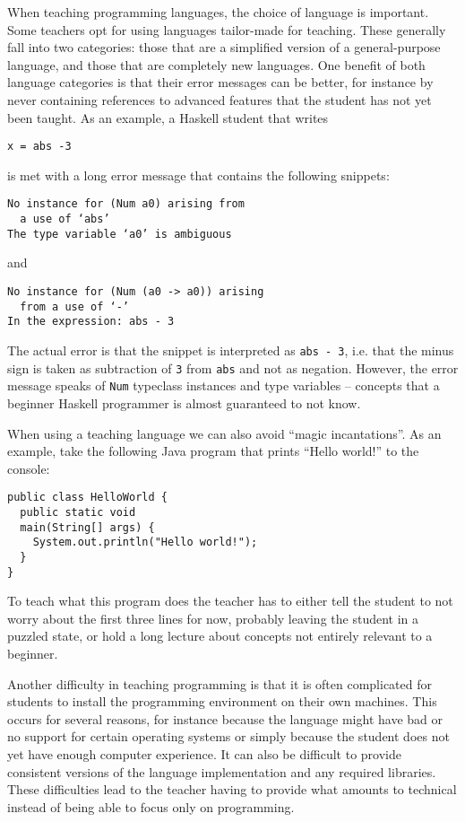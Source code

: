 When teaching programming languages, the choice of language is important.  Some
teachers opt for using languages tailor-made for teaching. These generally fall
into two categories: those that are a simplified version of a general-purpose
language, and those that are completely new languages. One benefit of both
language categories is that their error messages can be better, for instance by
never containing references to advanced features that the student has not yet
been taught. As an example, a Haskell student that writes
\begin{verbatim}
x = abs -3
\end{verbatim}
is met with a long error message that contains the following snippets:
\begin{verbatim}
No instance for (Num a0) arising from
  a use of ‘abs’
The type variable ‘a0’ is ambiguous
\end{verbatim}
and
\begin{verbatim}
No instance for (Num (a0 -> a0)) arising
  from a use of ‘-’
In the expression: abs - 3
\end{verbatim}
The actual error is that the snippet is interpreted as \texttt{abs - 3}, i.e.
that the minus sign is taken as subtraction of \texttt{3} from \texttt{abs} and
not as negation.  However, the error message speaks of \texttt{Num} typeclass
instances and type variables -- concepts that a beginner Haskell programmer is
almost guaranteed to not know.

When using a teaching language we can also avoid ``magic incantations''. As an
example, take the following Java program that prints ``Hello world!'' to the
console:
\begin{verbatim}
public class HelloWorld {
  public static void
  main(String[] args) {
    System.out.println("Hello world!");
  }
}
\end{verbatim}
To teach what this program does the teacher has to either tell the student to
not worry about the first three lines for now, probably leaving the student in
a puzzled state, or hold a long lecture about concepts not entirely relevant to
a beginner.

Another difficulty in teaching programming is that it is often complicated for
students to install the programming environment on their own machines. This
occurs for several reasons, for instance because the language might have bad or
no support for certain operating systems or simply because the student does not
yet have enough computer experience. It can also be difficult to provide
consistent versions of the language implementation and any required libraries.
These difficulties lead to the teacher having to provide what amounts to technical
instead of being able to focus only on programming.
